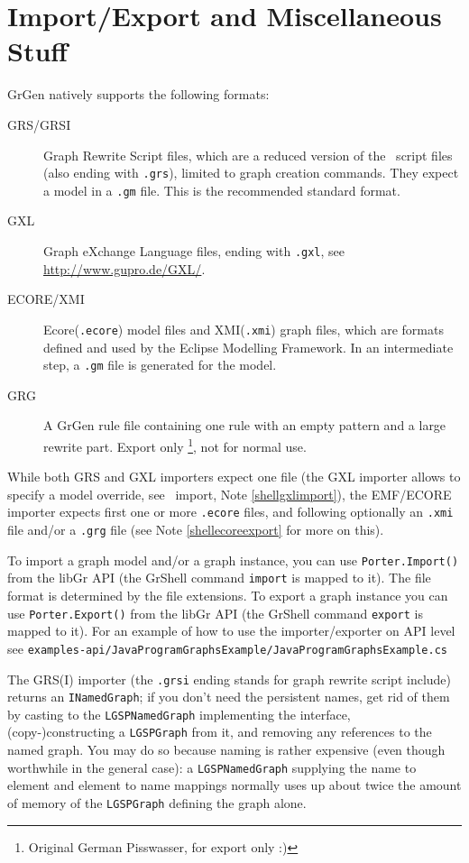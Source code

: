 \section{Import/Export and Miscellaneous Stuff}\label{sub:imexport}

GrGen natively supports the following formats:
\begin{description}
  \item[GRS/GRSI] Graph Rewrite Script files, which are a reduced version of the \GrShell\ script files (also ending with \texttt{.grs}), limited to graph creation commands. They expect a model in a \texttt{.gm} file. This is the recommended standard format.
  \item[GXL] Graph eXchange Language files, ending with \texttt{.gxl}, see \url{http://www.gupro.de/GXL/}.
  \item[ECORE/XMI] Ecore(\texttt{.ecore}) model files and XMI(\texttt{.xmi}) graph files, which are formats defined and used by the Eclipse Modelling Framework. In an intermediate step, a \texttt{.gm} file is generated for the model.
  \item[GRG] A GrGen rule file containing one rule with an empty pattern and a large rewrite part. Export only \footnote{Original German Pisswasser, for export only :)}, not for normal use.
\end{description}

While both GRS and GXL importers expect one file
(the GXL importer allows to specify a model override, see \GrShell\ import, Note \ref{shellgxlimport}),
the EMF/ECORE importer expects first one or more \texttt{.ecore} files,
and following optionally an \texttt{.xmi} file and/or a \texttt{.grg} file (see Note \ref{shellecoreexport} for more on this). 

To import a graph model and/or a graph instance, you can use \texttt{Porter.Import()} from the libGr API (the GrShell command \texttt{import} is mapped to it).
The file format is determined by the file extensions.
To export a graph instance you can use \texttt{Porter.Export()} from the libGr API (the GrShell command \texttt{export} is mapped to it).
For an example of how to use the importer/exporter on API level see \texttt{examples-api/Java\-Program\-Graphs\-Example/Java\-Program\-Graphs\-Example.cs}

The GRS(I) importer (the \texttt{.grsi} ending stands for graph rewrite script include) returns an \texttt{INamedGraph};
if you don't need the persistent names, get rid of them by casting to the \texttt{LGSPNamedGraph} implementing the interface, (copy-)constructing a \texttt{LGSPGraph} from it, and removing any references to the named graph.
You may do so because naming is rather expensive (even though worthwhile in the general case):
a \texttt{LGSPNamedGraph} supplying the name to element and element to name mappings normally uses up about twice the amount of memory of the \texttt{LGSPGraph} defining the graph alone.

